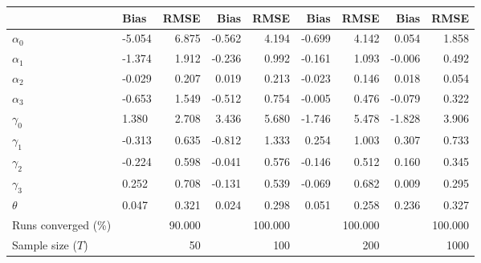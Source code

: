 
\begin{tabular}[t]{llrrrrrrr}
\toprule
  & Bias & RMSE & Bias & RMSE & Bias & RMSE & Bias & RMSE\\
\midrule
$\alpha_{0}$ & -5.054 & 6.875 & -0.562 & 4.194 & -0.699 & 4.142 & 0.054 & 1.858\\
$\alpha_{1}$ & -1.374 & 1.912 & -0.236 & 0.992 & -0.161 & 1.093 & -0.006 & 0.492\\
$\alpha_{2}$ & -0.029 & 0.207 & 0.019 & 0.213 & -0.023 & 0.146 & 0.018 & 0.054\\
$\alpha_{3}$ & -0.653 & 1.549 & -0.512 & 0.754 & -0.005 & 0.476 & -0.079 & 0.322\\
$\gamma_{0}$ & 1.380 & 2.708 & 3.436 & 5.680 & -1.746 & 5.478 & -1.828 & 3.906\\
$\gamma_{1}$ & -0.313 & 0.635 & -0.812 & 1.333 & 0.254 & 1.003 & 0.307 & 0.733\\
$\gamma_{2}$ & -0.224 & 0.598 & -0.041 & 0.576 & -0.146 & 0.512 & 0.160 & 0.345\\
$\gamma_{3}$ & 0.252 & 0.708 & -0.131 & 0.539 & -0.069 & 0.682 & 0.009 & 0.295\\
$\theta$ & 0.047 & 0.321 & 0.024 & 0.298 & 0.051 & 0.258 & 0.236 & 0.327\\
Runs converged (\%) &  & 90.000 &  & 100.000 &  & 100.000 &  & 100.000\\
Sample size ($T$) &  & 50 &  & 100 &  & 200 &  & 1000\\
\bottomrule
\end{tabular}
